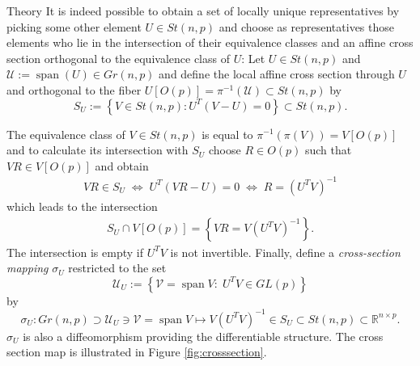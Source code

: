 \begin{chapter}{Theory}
It is indeed possible to obtain a set of locally unique representatives by picking some other element $U\in St(n,p)$ and choose as representatives those elements who lie in the intersection of their equivalence classes and an affine cross section
orthogonal to the equivalence class of $U$: Let $U\in St(n,p)$ and $\mathcal{U}:=\operatorname{span}(U) \in Gr(n,p)$ and define the local affine cross section through $U$ and orthogonal to the fiber $U[O(p)]=\pi^{-1}(\mathcal{U})\subset St(n,p)$ by
\begin{equation}
    S_U := \left\lbrace V\in St(n,p): U^T(V-U)=0 \right\rbrace\subset St(n,p).
\end{equation}

The equivalence class of $V\in St(n,p)$ is equal to $\pi^{-1}(\pi(V))=V[O(p)]$ and to calculate its intersection with $S_U$ choose $R\in O(p)$ such that
$VR\in V[O(p)]$ and obtain
\begin{align}
    VR\in S_U\;\Leftrightarrow\; U^T(VR-U)=0 \;\Leftrightarrow\; R = (U^TV)^{-1}
\end{align}
which leads to the intersection
\begin{align}
    S_U \cap V[O(p)] = \left\lbrace VR = V(U^{T}V)^{-1} \right\rbrace .
\end{align}
The intersection is empty if $U^{T}V$ is not invertible. Finally, define a \emph{cross-section mapping} $\sigma_U$ restricted to the set
\begin{equation}
    \mathcal{U}_U := \left\lbrace\mathcal{V}=\operatorname{span}V:\; U^TV\in GL(p) \right\rbrace
\end{equation}
by 
\begin{equation}
\label{eq:crosssectionmap}
    \sigma_U: Gr(n,p)\supset \mathcal{U}_U\ni\mathcal{V}=\operatorname{span}V\mapsto V(U^{T}V)^{-1} \in S_U \subset St(n,p)\subset \mathbb{R}^{n\times p}.
\end{equation}
$\sigma_U$ is also a diffeomorphism providing the differentiable structure. The cross section map is
illustrated in Figure \ref{fig:crosssection}.\\


\end{chapter}
